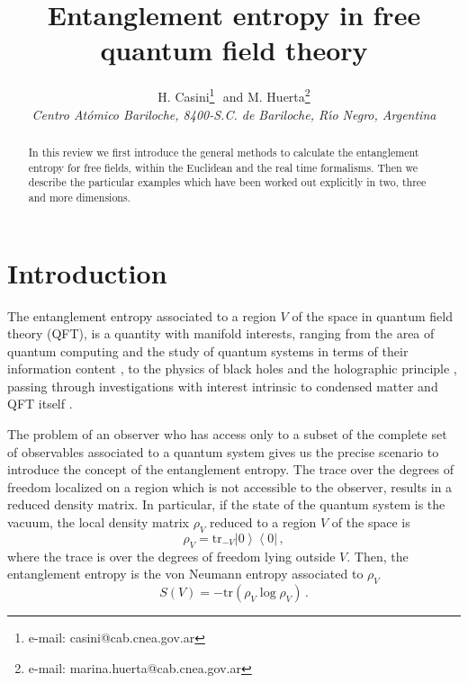 \documentclass[a4paper]{article}
\begin{document}
\date{}
\title{Entanglement entropy in free quantum field theory}
\author{H. Casini\footnote{e-mail: casini@cab.cnea.gov.ar}\,\, 
and
M. Huerta\footnote{e-mail: marina.huerta@cab.cnea.gov.ar} \\
{\sl Centro At\'omico Bariloche,
8400-S.C. de Bariloche, R\'{\i}o Negro, Argentina}}
\maketitle
\begin{abstract}
In this review we first introduce the general methods to calculate the entanglement entropy for free fields, within the Euclidean and the real time formalisms.  Then we describe the particular examples which have been worked out explicitly in two, three and more dimensions. 
\end{abstract}
\tableofcontents
\newpage
\section{Introduction}

The entanglement entropy associated to a region $V$ of the space in quantum field theory (QFT), is a quantity with manifold interests, ranging from the area of quantum computing and the study of quantum systems in terms of their information content \cite{chuang,upper}, to the physics of black holes \cite{bombelli,cw,srednicki} and the holographic principle \cite{holo}, passing through investigations with interest intrinsic to condensed matter \cite{cm,ami,vidal} and QFT itself \cite{cc,qft,ch1}. 

The problem of an observer who has access only to a subset of the complete set of observables associated to a quantum system gives us the precise scenario to introduce the concept of the entanglement entropy. 
The trace over the degrees of freedom localized on a region which is not accessible to the observer, results in a reduced density matrix. In particular, if the state of the quantum system is the vacuum,  
the local density matrix $\rho_V$ reduced to a region $V$ of the space is
\begin{equation}
\rho_V=\textrm{tr}_{-V}\left|0\right\rangle\left\langle 0\right|\,,
\end{equation}
where the trace is over the degrees of freedom lying outside $V$. Then, the entanglement entropy is the von Neumann entropy associated to $\rho_V$
\begin{equation}
S(V)=-\textrm{tr}(\rho_V\log \rho_V)\,.
\end{equation}
\end{document}
